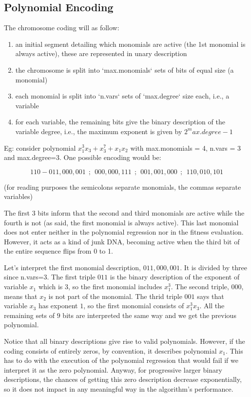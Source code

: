 \documentclass[a4paper, 12pt]{article}
\begin{document}
\subsection{Polynomial Encoding}

The chromosome coding will as follow:
\begin{enumerate}
\item an initial segment detailing which monomials are active (the 1st monomial is always active), these are represented in unary description
\item the chromosome is split into `max.monomials` sets of bits of equal size 
  (a monomial)
\item each monomial is split into `n.vars` sets of `max.degree` size each, i.e., a variable
\item for each variable, the remaining bits give the binary description of the variable degree, i.e., the maximum exponent is given by $2^max.degree-1$
\end{enumerate}

Eg: consider polynomial $x_1^3 x_3 + x_3^7 + x_1 x_2$ with max.monomials = 4, n.vars = 3 and max.degree=3. One possible encoding would be:

$$110 - 011,000,001~~;~~000,000,111~~;~~001,001,000~~;~~110,010,101$$

(for reading purposes the semicolons separate monomials, the commas separate variables)

The first 3 bits inform that the second and third monomials are active while the fourth is not (as said, the first monomial is always active). This last monomial does not enter neither in the polynomial regression nor in the fitness evaluation. However, it acts as a kind of junk DNA, becoming active when the third bit of the entire sequence flips from 0 to 1.

Let's interpret the first monomial description, $011,000,001$. It is divided by three since n.vars=3. The first triple $011$ is the binary description of the exponent of variable $x_1$ which is 3, so the first monomial includes $x_1^3$. The second triple, $000$, means that $x_2$ is not part of the monomial. The thrid triple $001$ says that variable $x_3$ has exponent $1$, so the first monomial consists of $x_1^3 x_3$. All the remaining sets of $9$ bits are interpreted the same way and we get the previous polynomial.

Notice that all binary descriptions give rise to valid polynomials. However, if the coding consists of entirely zeros, by convention, it describes polynomial $x_1$. This has to do with the execution of the polynomial regression that would fail if we interpret it as the zero polynomial. Anyway, for progressive larger  binary descriptions, the chances of getting this zero description decrease exponentially, so it does not impact in any meaningful way in the algorithm's performance.
\end{document}
